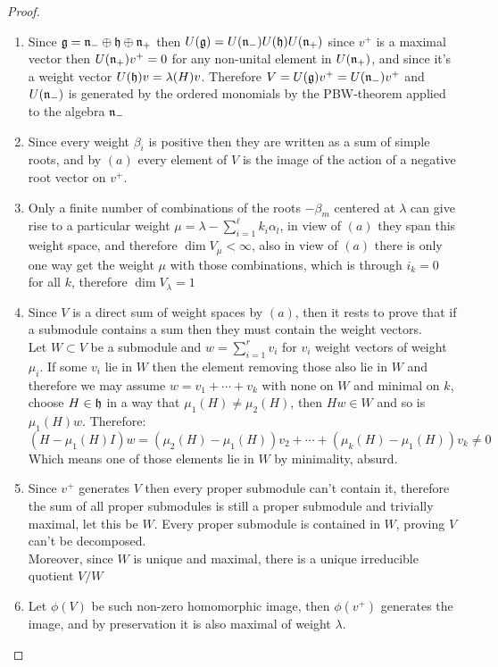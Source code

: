 \begin{proof}
\begin{enumerate}[label=(\alph*)]
	\item Since $\mathfrak{g}=\mathfrak{n}_{-} \oplus \mathfrak{h} \oplus \mathfrak{n}_{+}$ then $U(\mathfrak{g}) = U(\mathfrak{n}_-)U(\mathfrak{h})U(\mathfrak{n}_{+})$ since $v^+$ is a maximal vector then $U(\mathfrak{n}_{+})v^+=0$ for any non-unital element in $U(\mathfrak{n}_{+})$, and since it's a weight vector $U(\mathfrak{h})v = \lambda(H)v$. Therefore $V=U(\mathfrak{g})v^+ = U(\mathfrak{n}_-)v^+$ and $U(\mathfrak{n}_-)$ is generated by the ordered monomials by the PBW-theorem applied to the algebra $\mathfrak{n}_-$ 
	\item Since every weight $\beta_i$ is positive then they are written as a sum of simple roots, and by $(a)$ every element of $V$ is the image of the action of a negative root vector on $v^+$.
	\item Only a finite number of combinations of the roots $-\beta_m$ centered at $\lambda$ can give rise to a particular weight $\mu = \lambda - \sum_{i=1}^\ell k_i \alpha_l$, in view of $(a)$ they span this weight space, and therefore $\dim V_\mu < \infty$, also in view of $(a)$ there is only one way get the weight $\mu$ with those combinations, which is through $i_k=0$ for all $k$, therefore $\dim V_\lambda = 1$
	\item Since $V$ is a direct sum of weight spaces by $(a)$, then it rests to prove that if a submodule contains a sum then they must contain the weight vectors.\\
	Let $W \subset V$ be a submodule and $w = \sum_{i=1}^r v_i$ for $v_i$ weight vectors of weight $\mu_i$. If some $v_i$ lie in $W$ then the element removing those also lie in $W$ and therefore we may assume $w = v_1 + \cdots + v_k$ with none on $W$ and minimal on $k$, choose $H \in \mathfrak{h}$ in a way that $\mu_1(H) \not= \mu_2(H)$, then $Hw \in W$ and so is $\mu_1(H)w$. Therefore:
	$$(H - \mu_1(H)I)w = (\mu_2(H)-\mu_1(H))v_2 + \cdots + (\mu_k(H)-\mu_1(H))v_k \not=0 $$
	Which means one of those elements lie in $W$ by minimality, absurd.
	\item  Since $v^+$ generates $V$ then every proper submodule can't contain it, therefore the sum of all proper submodules is still a proper submodule and trivially maximal, let this be $W$. Every proper submodule is contained in $W$, proving $V$ can't be decomposed.\\
	Moreover, since $W$ is unique and maximal, there is a unique irreducible quotient $V/W$
	\item Let $\phi(V)$ be such non-zero homomorphic image, then $\phi(v^+)$ generates the image, and by preservation it is also maximal of weight $\lambda$.
\end{enumerate}
\end{proof}
